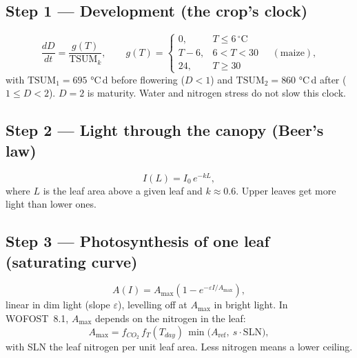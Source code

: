 \documentclass[11pt,a4paper]{article}
\begin{document}
\subsection*{Step 1 --- Development (the crop's clock)}
\begin{equation}
  \frac{dD}{dt} = \frac{g(T)}{\mathrm{TSUM}_k},\qquad
  g(T) = \begin{cases} 0, & T \le 6\,^{\circ}\mathrm{C}\\ T - 6, & 6 < T < 30\\ 24, & T \ge 30 \end{cases}
  \quad(\text{maize}),
\end{equation}
with \(\mathrm{TSUM}_1 = 695\) °C\,d before flowering (\(D<1\)) and \(\mathrm{TSUM}_2 = 860\) °C\,d after
(\(1 \le D < 2\)). \(D = 2\) is maturity. Water and nitrogen stress do not slow this clock.

\subsection*{Step 2 --- Light through the canopy (Beer's law)}
\begin{equation}
  I(L) = I_0\, e^{-k L},
\end{equation}
where \(L\) is the leaf area above a given leaf and \(k \approx 0.6\). Upper leaves get more light than lower ones.

\subsection*{Step 3 --- Photosynthesis of one leaf (saturating curve)}
\begin{equation}
  A(I) = A_{\max}\left(1 - e^{-\varepsilon I / A_{\max}}\right),
\end{equation}
linear in dim light (slope \(\varepsilon\)), levelling off at \(A_{\max}\) in bright light. In WOFOST~8.1,
\(A_{\max}\) depends on the nitrogen in the leaf:
\begin{equation}
  A_{\max} = f_{CO_2}\, f_T(T_{day})\,\min\!\big(A_{\mathrm{ref}},\ s\cdot \mathrm{SLN}\big),
\end{equation}
with SLN the leaf nitrogen per unit leaf area. Less nitrogen means a lower ceiling.
\end{document}
